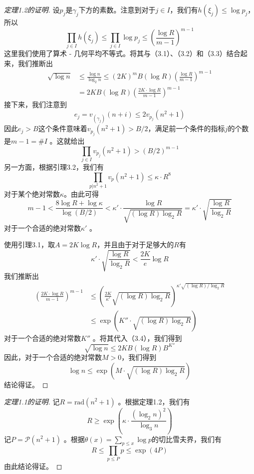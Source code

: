 \documentclass{article}
\begin{document}
\begin{proof}[定理1.2的证明]
设\(p_{j}\)是\(\gamma_{j}\)下方的素数。注意到对于\(j \in I\)，我们有\(h(\xi_{j}) \leq \log p_{j}\)，所以
\[
\prod_{j \in I} h(\xi_{j}) \leq \prod_{j \in I} \log p_{j} \leq \left(\frac{\log R}{m - 1}\right)^{m - 1}
\]
这里我们使用了算术 - 几何平均不等式。将其与（3.1）、（3.2）和（3.3）结合起来，我们推断出
\[
\begin{aligned} 
\sqrt{\log n} & \leq \frac{\log n}{\log _{2} n} \leq (2K)^{m} B(\log R)\left(\frac{\log R}{m - 1}\right)^{m - 1} \\ 
& =2K B(\log R)\left(\frac{2K \cdot \log R}{m - 1}\right)^{m - 1} 
\end{aligned}
\]
接下来，我们注意到
\[
e_{j}=v_{(\gamma_{j})}(n + i) \leq 2 v_{p_{j}}\left(n^{2}+1\right)
\]
因此\(e_{j}>B\)这个条件意味着\(v_{p_{j}}(n^{2}+1)>B / 2\)，满足前一个条件的指标\(j\)的个数是\(m - 1=\#I\) 。这就给出
\[
\prod_{j \in I} v_{p_{j}}\left(n^{2}+1\right)>(B / 2)^{m - 1}
\]
另一方面，根据引理3.2，我们有
\[
\prod_{p | n^{2}+1} v_{p}\left(n^{2}+1\right) \leq \kappa \cdot R^{8}
\]
对于某个绝对常数\(\kappa\)。由此可得
\[
m - 1<\frac{8 \log R+\log \kappa}{\log (B / 2)}<\kappa' \cdot \frac{\log R}{\sqrt{(\log R) \log _{2} R}}=\kappa' \cdot \sqrt{\frac{\log R}{\log _{2} R}}
\]
对于一个合适的绝对常数\(\kappa'\) 。

使用引理3.1，取\(A = 2K \log R\)，并且由于对于足够大的\(R\)有
\[
\kappa' \cdot \sqrt{\frac{\log R}{\log _{2} R}}<\frac{2K}{e} \log R
\]
我们推断出
\[
\begin{aligned} 
\left(\frac{2K \cdot \log R}{m - 1}\right)^{m - 1} & \leq \left(\frac{2K}{\kappa'} \sqrt{(\log R) \log _{2} R}\right)^{\kappa' \sqrt{(\log R) / \log _{2} R}} \\ 
& \leq \exp \left(K'' \cdot \sqrt{(\log R) \log _{2} R}\right) 
\end{aligned}
\]
对于一个合适的绝对常数\(K''\) 。将其代入（3.4），我们得到
\[
\sqrt{\log n} \leq 2K B(\log R) B^{K''} 
\]
因此，对于一个合适的绝对常数\(M>0\)，我们得到
\[
\log n \leq \exp \left(M \cdot \sqrt{(\log R) \log _{2} R}\right)
\]
结论得证。
\end{proof}

\begin{proof}[定理1.1的证明]
记\(R=\text{rad}(n^{2}+1)\) 。根据定理1.2，我们有
\[
R \geq \exp \left(\kappa \cdot \frac{\left(\log _{2} n\right)^{2}}{\log _{3} n}\right)
\]
记\(P=\mathscr{P}(n^{2}+1)\) 。根据\(\theta(x)=\sum_{p \leq x} \log p\)的切比雪夫界，我们有
\[
R \leq \prod_{p \leq P} p \leq \exp (4P)
\]
由此结论得证。
\end{proof}
\end{document}
